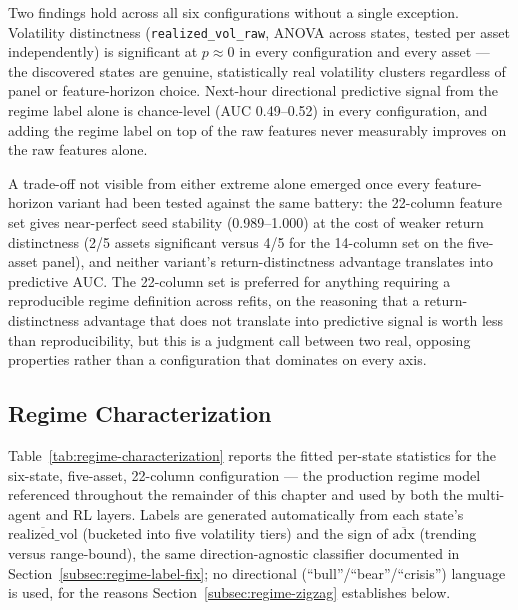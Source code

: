 Two findings hold across all six configurations without a single exception. Volatility distinctness (\texttt{realized\_vol\_raw}, ANOVA across states, tested per asset independently) is significant at $p\approx0$ in every configuration and every asset --- the discovered states are genuine, statistically real volatility clusters regardless of panel or feature-horizon choice. Next-hour directional predictive signal from the regime label alone is chance-level (AUC 0.49--0.52) in every configuration, and adding the regime label on top of the raw features never measurably improves on the raw features alone.

A trade-off not visible from either extreme alone emerged once every feature-horizon variant had been tested against the same battery: the 22-column feature set gives near-perfect seed stability (0.989--1.000) at the cost of weaker return distinctness (2/5 assets significant versus 4/5 for the 14-column set on the five-asset panel), and neither variant's return-distinctness advantage translates into predictive AUC. The 22-column set is preferred for anything requiring a reproducible regime definition across refits, on the reasoning that a return-distinctness advantage that does not translate into predictive signal is worth less than reproducibility, but this is a judgment call between two real, opposing properties rather than a configuration that dominates on every axis.

\subsection{Regime Characterization}
\label{subsec:regime-characterization}

Table~\ref{tab:regime-characterization} reports the fitted per-state statistics for the six-state, five-asset, 22-column configuration --- the production regime model referenced throughout the remainder of this chapter and used by both the multi-agent and RL layers. Labels are generated automatically from each state's $\overline{\mathrm{realized\_vol}}$ (bucketed into five volatility tiers) and the sign of $\overline{\mathrm{adx}}$ (trending versus range-bound), the same direction-agnostic classifier documented in Section~\ref{subsec:regime-label-fix}; no directional (``bull''/``bear''/``crisis'') language is used, for the reasons Section~\ref{subsec:regime-zigzag} establishes below.


